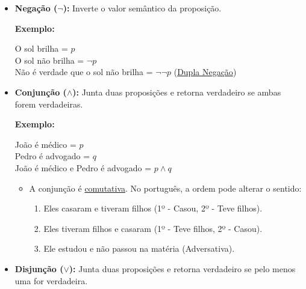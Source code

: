             \begin{itemize}[left=0.5cm, align=left, nosep]
                
                \item \textbf{Negação ($\neg$):} Inverte o valor semântico da proposição.
                    
                    \textbf{Exemplo:}
                    \begin{center}
                        O sol brilha = $p$ \\
                        O sol não brilha = $\neg p$ \\
                        Não é verdade que o sol não brilha = $\neg \neg p$ (\underline{Dupla Negação})    
                    \end{center}
                
                \item \textbf{Conjunção ($\land$):} Junta duas proposições e retorna verdadeiro se ambas forem verdadeiras.
                
                    \textbf{Exemplo:} 
                    \begin{center}
                        João é médico = $p$ \\
                        Pedro é advogado = $q$ \\ 
                        João é médico e Pedro é advogado = $p \land q$     
                    \end{center}
                    
                    \begin{itemize}[left=0.5cm, nosep, label=$\hookrightarrow$]
                        \item A conjunção é \underline{comutativa}. No português, a ordem pode alterar o sentido:
                        \begin{enumerate}[label=\arabic*., left=0.5cm, align=left, nosep]
                            \item Eles casaram e tiveram filhos (1º - Casou, 2º - Teve filhos).
                            \item Eles tiveram filhos e casaram (1º - Teve filhos, 2º - Casou).
                            \item Ele estudou e não passou na matéria (Adversativa).
                        \end{enumerate}
                    \end{itemize}

                \item \textbf{Disjunção ($\lor$):} Junta duas proposições e retorna verdadeiro se pelo menos uma for verdadeira.
                

\end{itemize}
